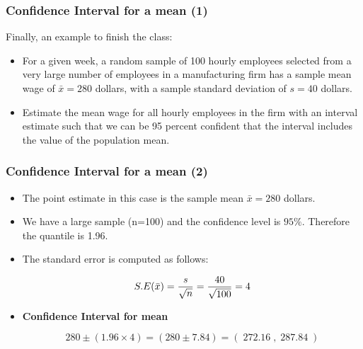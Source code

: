 \begin{frame}
\frametitle{Confidence Interval for a mean (1) }
Finally, an example to finish the class:
\begin{itemize}
\item For a given week, a random sample of 100 hourly employees selected from a very large number of
employees in a manufacturing firm has a sample mean wage of $\bar{x} = 280$ dollars, with a sample standard deviation of
$s = 40$ dollars.
\item Estimate the mean wage for all hourly employees in the firm with an interval estimate such that we can be 95
percent confident that the interval includes the value of the population mean.
\end{itemize}

\end{frame}
\begin{frame}
\frametitle{Confidence Interval for a mean (2) }

\begin{itemize}
\item The point estimate in this case is the sample mean $\bar{x} = 280$ dollars.
\item We have a large sample (n=100) and the confidence level is $95\%$. Therefore the quantile  is 1.96.
\item The standard error is computed as follows:

\[ S.E( \bar{x} )  = {s \over \sqrt{n}}  =  {40 \over \sqrt{100}} = 4  \]
\item \textbf{Confidence Interval for mean}

\[
280 \pm (1.96 \times 4)  = (280 \pm 7.84) = (\;272.16\;,\;287.84\;)
\]

\end{itemize}
\end{frame}






